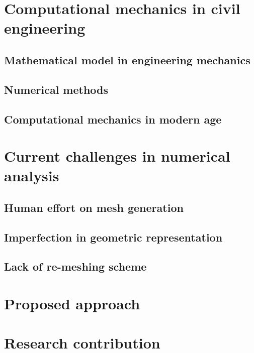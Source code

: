 

\section{Computational mechanics in civil engineering}

    \subsection{Mathematical model in engineering mechanics}

    \subsection{Numerical methods}

    \subsection{Computational mechanics in modern age}

\section{Current challenges in numerical analysis}

    \subsection{Human effort on mesh generation}

    \subsection{Imperfection in geometric representation}

    \subsection{Lack of re-meshing scheme}

\section{Proposed approach}
\paragraph{}


\section{Research contribution}

